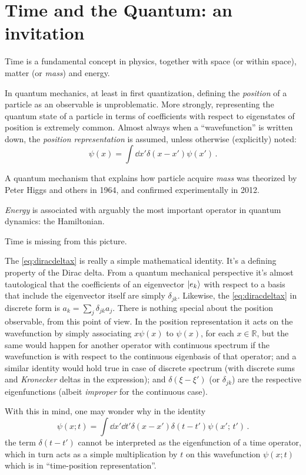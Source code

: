 \section{Time and the Quantum: an invitation}

Time is a fundamental concept in physics, together with space (or  within space),
matter (or \emph{mass}) and energy.

In quantum mechanics, at least in first quantization, defining the \emph{position} of a particle as
an observable is unproblematic. More strongly, representing the quantum state of a particle
in terms of coefficients with respect to eigenstates of position is extremely common.
Almost always when a ``wavefunction'' is written down, the \emph{position representation}
is assumed, unless otherwise (explicitly) noted:
\begin{equation}\label{eq:diracdeltax}
  \psi(x) = \int \dd{x'} \delta(x-x') \psi(x') \,\text{.}
\end{equation}

A quantum mechanism that explains how particle acquire \emph{mass} was theorized by
Peter Higgs and others in 1964, and confirmed experimentally in 2012.

\emph{Energy} is associated with arguably the most important operator in quantum dynamics: the Hamiltonian.

Time is missing from this picture.

The \eqref{eq:diracdeltax} is really a simple mathematical identity.
It's a defining property of the Dirac delta.
From a quantum mechanical perspective it's almost tautological
that the coefficients of an eigenvector $\ket{e_k}$ with respect to a basis
that include the eigenvector itself are simply $\delta_{jk}$.
Likewise, the \eqref{eq:diracdeltax} in discrete form is $a_k = \sum_j \delta_{jk} a_j$.
There is nothing special about the position observable, from this point of view.
In the position representation it acts on the wavefunction by simply
associating $x\psi(x)$ to $\psi(x)$, for each $x \in \mathbb{R}$,
but the same would happen for another operator with continuous spectrum
if the wavefunction is with respect to the continuous eigenbasis
of that operator; and a similar identity
would hold true in case of discrete spectrum
(with discrete sums and \emph{Kronecker} deltas in the expression);
and $\delta(\xi-\xi')$ (or $\delta_{jk}$) are the respective
eigenfunctions (albeit \emph{improper} for the continuous case).

With this in mind, one may wonder why in the identity
\begin{equation}\label{eq:diracdeltaxt}
  \psi(x; t) = \int \dd{x'}\dd{t'} \delta(x-x')\delta(t-t') \psi(x';\, t') \,\text{.}
\end{equation}
the term $\delta(t-t')$ cannot be interpreted as the eigenfunction of a time operator,
which in turn acts as a simple multiplication by $t$ on this
wavefunction $\psi(x; t)$ which is in ``time-position representation''.
